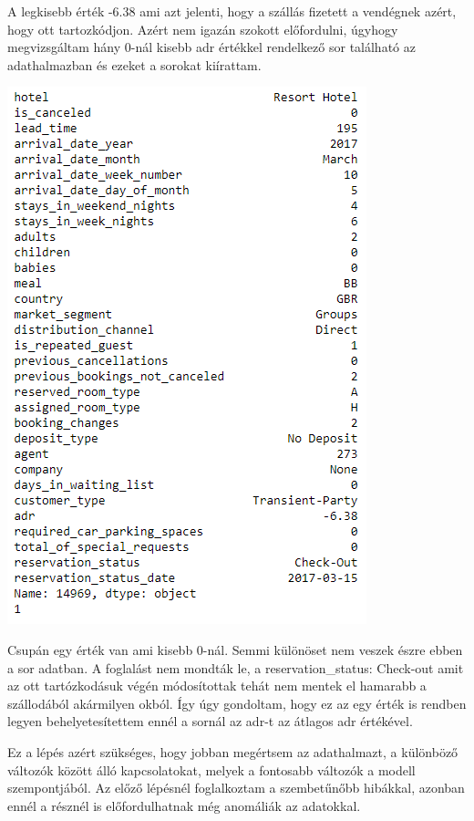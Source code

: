 A legkisebb érték -6.38 ami azt jelenti, hogy a szállás fizetett a vendégnek azért, hogy ott tartozkódjon. Azért nem igazán szokott előfordulni, úgyhogy megvizsgáltam hány 0-nál kisebb adr értékkel rendelkező sor található az adathalmazban és ezeket a sorokat kiírattam.

\includegraphics[scale=0.55]{images/4.fejezet/2.adattisztitas4.PNG}

Csupán egy érték van ami kisebb 0-nál. Semmi különöset nem veszek észre ebben a sor adatban. A foglalást nem mondták le, a reservation\_status: Check-out amit az ott tartózkodásuk végén módosítottak tehát nem mentek el hamarabb a szállodából akármilyen okból. Így úgy gondoltam, hogy ez az egy érték is rendben legyen behelyetesítettem ennél a sornál az adr-t az átlagos adr értékével.


Ez a lépés azért szükséges, hogy jobban megértsem az adathalmazt, a különböző változók között álló kapcsolatokat, melyek a fontosabb változók a modell szempontjából. Az előző lépésnél foglalkoztam a szembetűnőbb hibákkal, azonban ennél a résznél is előfordulhatnak még anomáliák az adatokkal.

